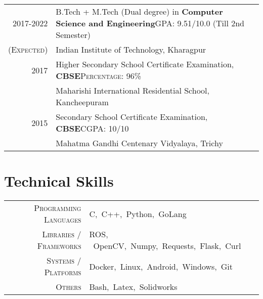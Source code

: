 \documentclass[a4paper,10pt]{extarticle} %
\begin{document}
  \begin{tabular}{r|p{17.5cm}}	
  2017-2022 & B.Tech + M.Tech (Dual degree) in \textbf{Computer Science and Engineering}\hfill\textsc{GPA: } 9.51/10.0 (Till 2nd Semester)\\
  \textsc{(Expected)}& Indian Institute of Technology, Kharagpur \hfill\\
  2017 & Higher Secondary School Certificate Examination, \textbf{CBSE}\hfill\textsc{Percentage: } 96\% \\
  & Maharishi International Residential School, Kancheepuram \hfill\\
  2015 & Secondary School Certificate Examination, \textbf{CBSE}\hfill\textsc{CGPA: } 10/10 \\
  & Mahatma Gandhi Centenary Vidyalaya, Trichy \hfill\\
  \end{tabular}
  
  \vspace{-0.1cm}
  \section{\textcolor{primary}{Technical Skills}}
  
  \begin{tabular}{r|p{15cm}}
  \textsc{Programming Languages} & C,\ C++,\ Python,\ GoLang \\
  \textsc{Libraries / Frameworks} & ROS, \ OpenCV,\ Numpy,\ Requests,\ Flask,\ Curl \\
  \textsc{Systems / Platforms} & Docker,\ Linux,\ Android,\ Windows,\ Git \\
  \textsc{Others} & Bash,\ Latex,\ Solidworks \\
  \end{tabular}
  
  \vspace{-0.2cm}
\end{document}
